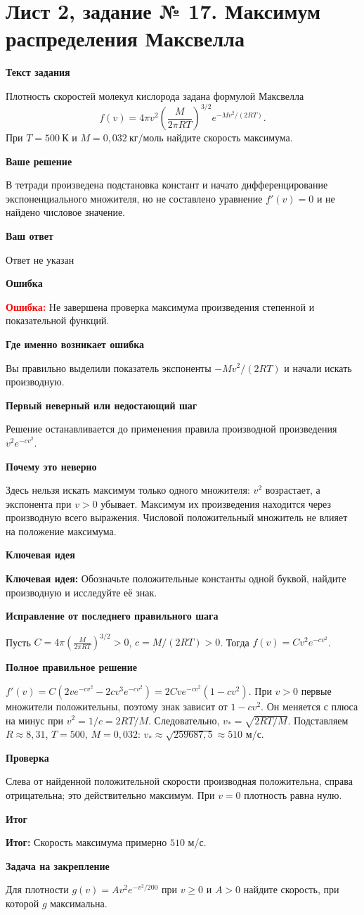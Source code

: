 \documentclass[11pt,a4paper]{article}
\newcommand{\Idea}{\textcolor{blue!60!black}{\textbf{Ключевая идея:}}}
\newcommand{\Res}{\textcolor{teal!60!black}{\textbf{Итог:}}}
\newcommand{\Heading}[2]{\par\medskip\textbf{#1}\par#2\par}
\begin{document}
\section*{Лист 2, задание № 17. Максимум распределения Максвелла}
\Heading{Текст задания}{Плотность скоростей молекул кислорода задана формулой Максвелла\[f(v)=4\pi v^2\left(\frac{M}{2\pi RT}\right)^{3/2}e^{-Mv^2/(2RT)}.\]При $T=500\ \text{К}$ и $M=0{,}032\ \text{кг/моль}$ найдите скорость максимума.}
\Heading{Ваше решение}{В тетради произведена подстановка констант и начато дифференцирование экспоненциального множителя, но не составлено уравнение $f\prime(v)=0$ и не найдено числовое значение.}
\Heading{Ваш ответ}{Ответ не указан}
\Heading{Ошибка}{\textcolor{red}{\textbf{Ошибка:}} Не завершена проверка максимума произведения степенной и показательной функций.}
\Heading{Где именно возникает ошибка}{Вы правильно выделили показатель экспоненты $-Mv^2/(2RT)$ и начали искать производную.}
\Heading{Первый неверный или недостающий шаг}{Решение останавливается до применения правила производной произведения $v^2 e^{-cv^2}$.}
\Heading{Почему это неверно}{Здесь нельзя искать максимум только одного множителя: $v^2$ возрастает, а экспонента при $v>0$ убывает. Максимум их произведения находится через производную всего выражения. Числовой положительный множитель не влияет на положение максимума.}
\Heading{Ключевая идея}{\Idea{} Обозначьте положительные константы одной буквой, найдите производную и исследуйте её знак.}
\Heading{Исправление от последнего правильного шага}{Пусть $C=4\pi\left(\frac{M}{2\pi RT}\right)^{3/2}>0$, $c=M/(2RT)>0$. Тогда $f(v)=Cv^2e^{-cv^2}$.}
\Heading{Полное правильное решение}{$f\prime(v)=C(2ve^{-cv^2}-2cv^3e^{-cv^2})=2Cve^{-cv^2}(1-cv^2)$. При $v>0$ первые множители положительны, поэтому знак зависит от $1-cv^2$. Он меняется с плюса на минус при $v^2=1/c=2RT/M$. Следовательно, $v_*=\sqrt{2RT/M}$. Подставляем $R\approx8{,}31$, $T=500$, $M=0{,}032$: $v_*\approx\sqrt{259687{,}5}\approx510$ м/с.}
\Heading{Проверка}{Слева от найденной положительной скорости производная положительна, справа отрицательна; это действительно максимум. При $v=0$ плотность равна нулю.}
\Heading{Итог}{\Res{} Скорость максимума примерно $510$ м/с.}
\Heading{Задача на закрепление}{Для плотности $g(v)=Av^2e^{-v^2/200}$ при $v\ge0$ и $A>0$ найдите скорость, при которой $g$ максимальна.}
\newpage
{}\label{task:3_1}
\end{document}
